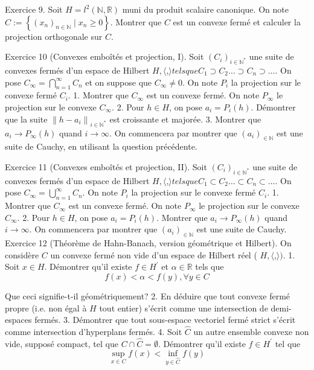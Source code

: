 \documentclass[12pt,a4paper]{article}
\begin{document}
Exercice 9. Soit \(H=l^{2}(\mathbb{N}, \mathbb{R})\) muni du produit scalaire canonique. On note \(C:=\left\{\left(x_{n}\right)_{n \in \mathbb{N}} \mid x_{n} \geqslant 0\right\}\). Montrer que \(C\) est un convexe fermé et calculer la projection orthogonale sur \(C\).

Exercice 10 (Convexes emboîtés et projection, I). Soit \(\left(C_{i}\right)_{i \in \mathbb{N}^{*}}\) une suite de convexes fermés d'un espace de Hilbert \(H,\langle\),\(\rangle tels que C_{1} \supset C_{2} \ldots \supset C_{n} \supset \ldots\). On pose \(C_{\infty}=\bigcap_{n=1}^{\infty} C_{n}\) et on suppose que \(C_{\infty} \neq 0\). On note \(P_{i}\) la projection sur le convexe fermé \(C_{i}\).
1. Montrer que \(C_{\infty}\) est un convexe fermé. On note \(P_{\infty}\) le projection sur le convexe \(C_{\infty}\).
2. Pour \(h \in H\), on pose \(a_{i}=P_{i}(h)\). Démontrer que la suite \(\left\|h-a_{i}\right\|_{i \in \mathbb{N}^{*}}\) est croissante et majorée.
3. Montrer que \(a_{i} \rightarrow P_{\infty}(h)\) quand \(i \rightarrow \infty\). On commencera par montrer que \(\left(a_{i}\right)_{\in \mathbb{N}}\) est une suite de Cauchy, en utilisant la question précédente.

Exercice 11 (Convexes emboîtés et projection, II). Soit \(\left(C_{i}\right)_{i \in \mathbb{N}^{*}}\) une suite de convexes fermés d'un espace de Hilbert \(H,\langle\),\(\rangle tels que C_{1} \subset C_{2} \ldots \subset C_{n} \subset \ldots\). On pose \(C_{\infty}=\bigcup_{n=1}^{\infty} C_{n}\). On note \(P_{i}\) la projection sur le convexe fermé \(C_{i}\).
1. Montrer que \(C_{\infty}\) est un convexe fermé. On note \(P_{\infty}\) le projection sur le convexe \(C_{\infty}\).
2. Pour \(h \in H\), on pose \(a_{i}=P_{i}(h)\). Montrer que \(a_{i} \rightarrow P_{\infty}(h)\) quand \(i \rightarrow \infty\). On commencera par montrer que \(\left(a_{i}\right)_{\in \mathbb{N}}\) est une suite de Cauchy.
Exercice 12 (Théorème de Hahn-Banach, version géométrique et Hilbert). On considère \(C\) un convexe fermé non vide d'un espace de Hilbert réel ( \(H,\langle\),\(\rangle ).\)
1. Soit \(x \in H\). Démontrer qu'il existe \(f \in H^{\prime}\) et \(\alpha \in \mathbb{R}\) tels que
\[
f(x)<\alpha<f(y), \forall y \in C
\]

Que ceci signifie-t-il géométriquement?
2. En déduire que tout convexe fermé propre (i.e. non égal à \(H\) tout entier) s'écrit comme une intersection de demi-espaces fermés.
3. Démontrer que tout sous-espace vectoriel fermé strict s'écrit comme intersection d'hyperplans fermés.
4. Soit \(\widehat{C}\) un autre ensemble convexe non vide, supposé compact, tel que \(C \cap \widehat{C}=\emptyset\). Démontrer qu'il existe \(f \in H^{\prime}\) tel que
\[
\sup _{x \in C} f(x)<\inf _{y \in \widehat{C}} f(y)
\]
\end{document}
